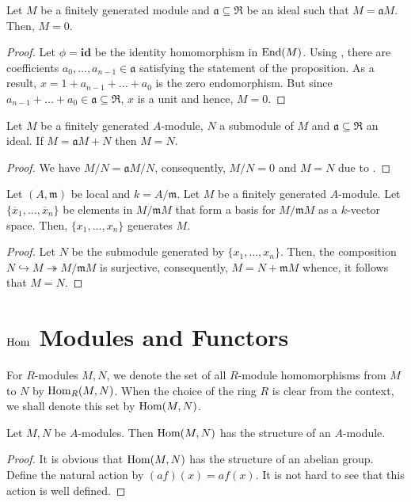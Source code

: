 \begin{lemma}[Nakayama]
    Let $M$ be a finitely generated module and $\mathfrak a\subseteq\mathfrak R$ be an ideal such that $M = \mathfrak aM$. Then, $M = 0$. 
\end{lemma}
\begin{proof}
    Let $\phi = \mathbf{id}$ be the identity homomorphism in $\operatorname{End}(M)$. Using , there are coefficients $a_0,\ldots,a_{n - 1}\in\mathfrak a$ satisfying the statement of the proposition. As a result, $x = 1 + a_{n - 1} + \ldots + a_0$ is the zero endomorphism. But since $a_{n - 1} + \ldots + a_0\in\mathfrak a\subseteq\mathfrak R$, $x$ is a unit and hence, $M = 0$.
\end{proof}

\begin{corollary}
    Let $M$ be a finitely generated $A$-module, $N$ a submodule of $M$ and $\mathfrak a\subseteq\mathfrak R$ an ideal. If $M = \mathfrak aM + N$ then $M = N$.
\end{corollary}
\begin{proof}
    We have $M/N = \mathfrak aM/N$, consequently, $M/N = 0$ and $M = N$ due to .
\end{proof}

\begin{lemma}
    Let $(A,\mathfrak m)$ be local and $k = A/\mathfrak m$. Let $M$ be a finitely generated $A$-module. Let $\{\overline x_1,\ldots,\overline x_n\}$ be elements in $M/\mathfrak mM$ that form a basis for $M/\mathfrak mM$ as a $k$-vector space. Then, $\{x_1,\ldots,x_n\}$ generates $M$.
\end{lemma}
\begin{proof}
    Let $N$ be the submodule generated by $\{x_1,\ldots,x_n\}$. Then, the composition $N\hookrightarrow M\twoheadrightarrow M/\mathfrak mM$ is surjective, consequently, $M = N + \mathfrak mM$ whence, it follows that $M = N$.
\end{proof}

\section{\texorpdfstring{$\operatorname{Hom}$}{} Modules and Functors}

For $R$-modules $M,N$, we denote the set of all $R$-module homomorphisms from $M$ to $N$ by $\operatorname{Hom}_R(M,N)$. When the choice of the ring $R$ is clear from the context, we shall denote this set by $\operatorname{Hom}(M,N)$.

\begin{proposition}
    Let $M,N$ be $A$-modules. Then $\operatorname{Hom}(M,N)$ has the structure of an $A$-module.
\end{proposition}
\begin{proof}
    It is obvious that $\operatorname{Hom}(M,N)$ has the structure of an abelian group. Define the natural action by $(af)(x) = af(x)$. It is not hard to see that this action is well defined.
\end{proof}

